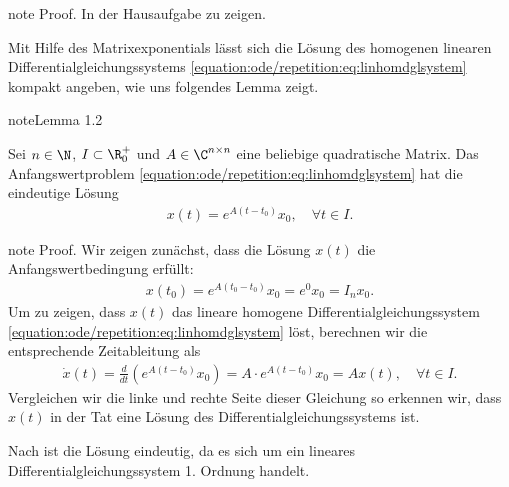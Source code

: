 \documentclass[letterpaper,10pt,german]{jupyterBook}
\begin{document}
\begin{sphinxadmonition}{note}
\sphinxAtStartPar
Proof. In der Hausaufgabe zu zeigen.
\end{sphinxadmonition}

\sphinxAtStartPar
Mit Hilfe des Matrixexponentials lässt sich die Lösung des homogenen linearen Differentialgleichungssystems \eqref{equation:ode/repetition:eq:linhomdglsystem} kompakt angeben, wie uns folgendes Lemma zeigt.
\label{ode/repetition:lemma-15}
\begin{sphinxadmonition}{note}{Lemma 1.2}



\sphinxAtStartPar
Sei \(n\in \N\), \(I \subset \R^+_0\) und \(A \in \C^{n\times n}\) eine beliebige quadratische Matrix.
Das Anfangswertproblem \eqref{equation:ode/repetition:eq:linhomdglsystem} hat die eindeutige Lösung
\begin{equation*}
\begin{split}x(t) = e^{A(t-t_0)}x_0, \quad \forall t \in I.\end{split}
\end{equation*}\end{sphinxadmonition}

\begin{sphinxadmonition}{note}
\sphinxAtStartPar
Proof. Wir zeigen zunächst, dass die Lösung \(x(t)\) die Anfangswertbedingung erfüllt:
\begin{equation*}
\begin{split}x(t_0) = e^{A(t_0-t_0)}x_0 = e^0x_0 = I_n x_0.\end{split}
\end{equation*}
\sphinxAtStartPar
Um zu zeigen, dass \(x(t)\) das lineare homogene Differentialgleichungssystem \eqref{equation:ode/repetition:eq:linhomdglsystem} löst, berechnen wir die entsprechende Zeitableitung als
\begin{equation*}
\begin{split}\dot{x}(t) = \frac{d}{dt}(e^{A(t-t_0)}x_0) = A \cdot e^{A(t-t_0)}x_0 = A x(t), \quad \forall t \in I.\end{split}
\end{equation*}
\sphinxAtStartPar
Vergleichen wir die linke und rechte Seite dieser Gleichung so erkennen wir, dass \(x(t)\) in der Tat eine Lösung des Differentialgleichungssystems ist.

\sphinxAtStartPar
Nach {\hyperref[\detokenize{ode/repetition:cor:eindeutigkeitlinear}]{}} ist die Lösung eindeutig, da es sich um ein lineares Differentialgleichungssystem 1. Ordnung handelt.
\end{sphinxadmonition}
\end{document}
